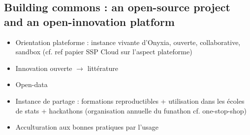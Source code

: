 \subsection{Building commons : an open-source project and an open-innovation platform}

\begin{itemize}
    \item Orientation plateforme : instance vivante d'Onyxia, ouverte, collaborative, sandbox (cf. ref papier SSP Cloud sur l'aspect plateforme)
    \item Innovation ouverte $\rightarrow$ littérature
    \item Open-data
    \item Instance de partage : formations reproductibles + utilisation dans les écoles de stats + hackathons (organisation annuelle du funathon cf. one-stop-shop)
    \item Acculturation aux bonnes pratiques par l'usage
\end{itemize}
